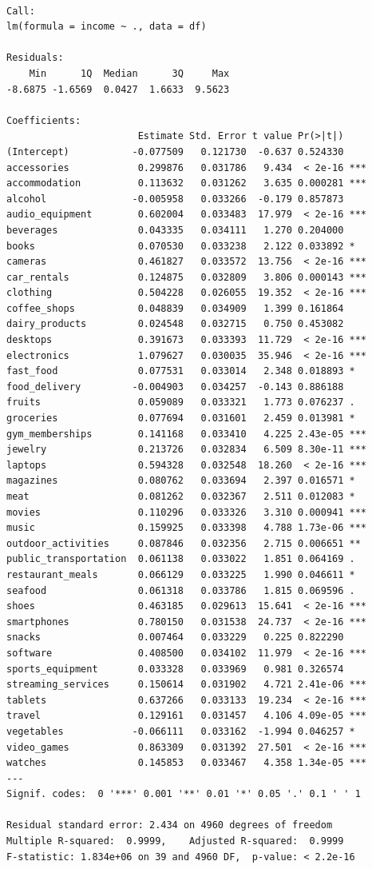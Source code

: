 \documentclass[
  letterpaper,
  DIV=11,
  numbers=noendperiod]{scrartcl}
\begin{document}
\begin{verbatim}

Call:
lm(formula = income ~ ., data = df)

Residuals:
    Min      1Q  Median      3Q     Max 
-8.6875 -1.6569  0.0427  1.6633  9.5623 

Coefficients:
                       Estimate Std. Error t value Pr(>|t|)    
(Intercept)           -0.077509   0.121730  -0.637 0.524330    
accessories            0.299876   0.031786   9.434  < 2e-16 ***
accommodation          0.113632   0.031262   3.635 0.000281 ***
alcohol               -0.005958   0.033266  -0.179 0.857873    
audio_equipment        0.602004   0.033483  17.979  < 2e-16 ***
beverages              0.043335   0.034111   1.270 0.204000    
books                  0.070530   0.033238   2.122 0.033892 *  
cameras                0.461827   0.033572  13.756  < 2e-16 ***
car_rentals            0.124875   0.032809   3.806 0.000143 ***
clothing               0.504228   0.026055  19.352  < 2e-16 ***
coffee_shops           0.048839   0.034909   1.399 0.161864    
dairy_products         0.024548   0.032715   0.750 0.453082    
desktops               0.391673   0.033393  11.729  < 2e-16 ***
electronics            1.079627   0.030035  35.946  < 2e-16 ***
fast_food              0.077531   0.033014   2.348 0.018893 *  
food_delivery         -0.004903   0.034257  -0.143 0.886188    
fruits                 0.059089   0.033321   1.773 0.076237 .  
groceries              0.077694   0.031601   2.459 0.013981 *  
gym_memberships        0.141168   0.033410   4.225 2.43e-05 ***
jewelry                0.213726   0.032834   6.509 8.30e-11 ***
laptops                0.594328   0.032548  18.260  < 2e-16 ***
magazines              0.080762   0.033694   2.397 0.016571 *  
meat                   0.081262   0.032367   2.511 0.012083 *  
movies                 0.110296   0.033326   3.310 0.000941 ***
music                  0.159925   0.033398   4.788 1.73e-06 ***
outdoor_activities     0.087846   0.032356   2.715 0.006651 ** 
public_transportation  0.061138   0.033022   1.851 0.064169 .  
restaurant_meals       0.066129   0.033225   1.990 0.046611 *  
seafood                0.061318   0.033786   1.815 0.069596 .  
shoes                  0.463185   0.029613  15.641  < 2e-16 ***
smartphones            0.780150   0.031538  24.737  < 2e-16 ***
snacks                 0.007464   0.033229   0.225 0.822290    
software               0.408500   0.034102  11.979  < 2e-16 ***
sports_equipment       0.033328   0.033969   0.981 0.326574    
streaming_services     0.150614   0.031902   4.721 2.41e-06 ***
tablets                0.637266   0.033133  19.234  < 2e-16 ***
travel                 0.129161   0.031457   4.106 4.09e-05 ***
vegetables            -0.066111   0.033162  -1.994 0.046257 *  
video_games            0.863309   0.031392  27.501  < 2e-16 ***
watches                0.145853   0.033467   4.358 1.34e-05 ***
---
Signif. codes:  0 '***' 0.001 '**' 0.01 '*' 0.05 '.' 0.1 ' ' 1

Residual standard error: 2.434 on 4960 degrees of freedom
Multiple R-squared:  0.9999,    Adjusted R-squared:  0.9999 
F-statistic: 1.834e+06 on 39 and 4960 DF,  p-value: < 2.2e-16
\end{verbatim}
\end{document}
